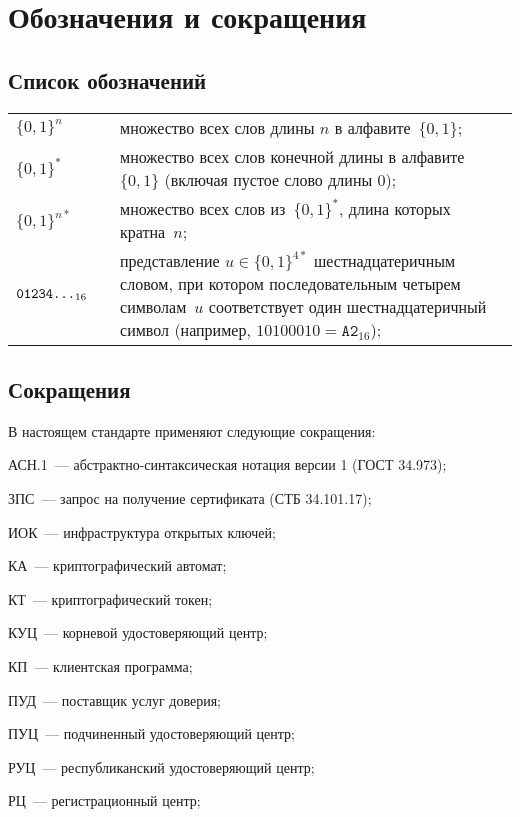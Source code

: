 \chapter{Обозначения и сокращения}\label{DEFS}

\section{Список обозначений}

{\tabcolsep 0pt
\begin{longtable}{lrp{13.5cm}}
$\{0,1\}^n$  & \hspace{2mm} &
множество всех слов длины $n$ в алфавите~$\{0,1\}$;
\\[4pt]
$\{0,1\}^*$  &&
множество всех слов конечной длины в алфавите~$\{0,1\}$
(включая пустое слово длины $0$);
\\[4pt]
%
$\{0,1\}^{n*}$  &&
множество всех слов из~$\{0,1\}^*$,
длина которых кратна~$n$;
\\[4pt]
%
$\texttt{01234\ldots}_{16}$ && 
представление $u\in\{0,1\}^{4*}$ шестнадцатеричным словом,
при котором последовательным четырем символам~$u$ соответствует
один шестнадцатеричный символ
(например, $10100010=\texttt{A2}_{16}$);
\\[4pt]
\end{longtable}
} %
\setcounter{table}{0}

\section{Сокращения}

В настоящем стандарте применяют следующие сокращения:

АСН.1~--- абстрактно-синтаксическая нотация версии 1 (ГОСТ 34.973);

ЗПС~--- запрос на получение сертификата (СТБ 34.101.17);

ИОК~--- инфраструктура открытых ключей;

КА~--- криптографический автомат;

КТ~--- криптографический токен;

КУЦ~--- корневой удостоверяющий центр;

КП~--- клиентская программа;

ПУД~--- поставщик услуг доверия;

ПУЦ~--- подчиненный удостоверяющий центр;

РУЦ~--- республиканский удостоверяющий центр;

РЦ~--- регистрационный центр;


